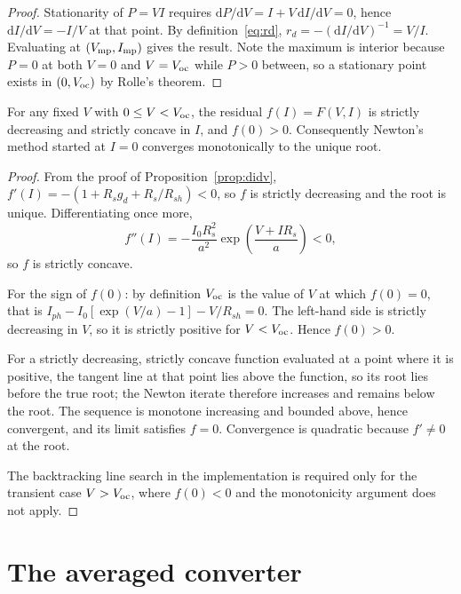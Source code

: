 \begin{proof}
Stationarity of $P = VI$ requires
$\mathrm{d}P/\mathrm{d}V = I + V\,\mathrm{d}I/\mathrm{d}V = 0$, hence
$\mathrm{d}I/\mathrm{d}V = -I/V$ at that point. By
definition~\eqref{eq:rd}, $r_d = -(\mathrm{d}I/\mathrm{d}V)^{-1} = V/I$.
Evaluating at $(V_{\mathrm{mp}}, I_{\mathrm{mp}})$ gives the result. Note the maximum is interior
because $P = 0$ at both $V = 0$ and $V = V_{\mathrm{oc}}$ while $P > 0$ between, so a
stationary point exists in $(0, V_{\mathrm{oc}})$ by Rolle's theorem.
\end{proof}

\begin{proposition}
\label{prop:newton}
For any fixed $V$ with $0 \le V < V_{\mathrm{oc}}$, the residual
$f(I) = F(V,I)$ is strictly decreasing and strictly concave in $I$, and
$f(0) > 0$. Consequently Newton's method started at $I = 0$ converges
monotonically to the unique root.
\end{proposition}

\begin{proof}
From the proof of Proposition~\ref{prop:didv},
$f'(I) = -\left(1 + R_s g_d + R_s/R_{sh}\right) < 0$, so $f$ is strictly
decreasing and the root is unique. Differentiating once more,
\[
f''(I) = -\frac{I_0 R_s^2}{a^2}\exp\!\left(\frac{V+IR_s}{a}\right) < 0,
\]
so $f$ is strictly concave.

For the sign of $f(0)$: by definition $V_{\mathrm{oc}}$ is the value of $V$ at which
$f(0) = 0$, that is
$I_{ph} - I_0[\exp(V/a) - 1] - V/R_{sh} = 0$. The left-hand side is strictly
decreasing in $V$, so it is strictly positive for $V < V_{\mathrm{oc}}$. Hence $f(0) > 0$.

For a strictly decreasing, strictly concave function evaluated at a point where
it is positive, the tangent line at that point lies above the function, so its
root lies before the true root; the Newton iterate therefore increases and
remains below the root. The sequence is monotone increasing and bounded above,
hence convergent, and its limit satisfies $f = 0$. Convergence is quadratic
because $f' \ne 0$ at the root.

The backtracking line search in the implementation is required only for the
transient case $V > V_{\mathrm{oc}}$, where $f(0) < 0$ and the monotonicity argument does
not apply.
\end{proof}

\section{The averaged converter}

